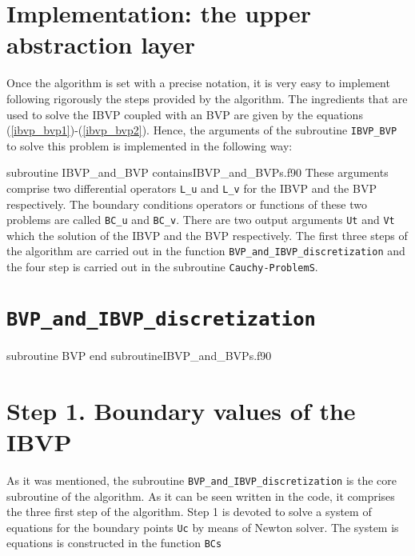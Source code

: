 
 
       

       

 
\newpage
\section{Implementation: the upper abstraction layer}

Once the algorithm is set with a precise notation, it is very easy to implement following rigorously the steps provided by the algorithm. 
The ingredients that are used to solve the IBVP coupled with an BVP are given by the equations (\ref{ibvp_bvp1})-(\ref{ibvp_bvp2}). Hence, the arguments of the subroutine \verb|IBVP_BVP| to solve this problem is implemented in the following way: 
 
\vspace{0.5cm} 
{subroutine IBVP_and_BVP}
{contains}{IBVP_and_BVPs.f90}
These arguments comprise two differential operators \verb|L_u| and \verb|L_v| for the IBVP and the BVP respectively. The boundary conditions operators or functions of these two problems are called  \verb|BC_u| and \verb|BC_v|. There are two output arguments \verb|Ut| and \verb|Vt| which the solution of the IBVP and the BVP respectively. 
The first three steps of the algorithm are carried out in the function \verb|BVP_and_IBVP_discretization| and the four step is carried out in the subroutine \verb|Cauchy-ProblemS|.

\section{\texttt{BVP\_and\_IBVP\_discretization}}

\vspace{0.5cm} 
{subroutine BVP}
{end subroutine}{IBVP_and_BVPs.f90}


\section{Step 1. Boundary values of the IBVP}
As it was mentioned, the subroutine \verb|BVP_and_IBVP_discretization| is the core subroutine of the algorithm. As it can be seen written in the code, it comprises the three first step of the algorithm. 
Step 1 is devoted to solve a system of equations for the boundary points \verb|Uc| by means of Newton solver. The system is equations is constructed in the function \verb|BCs| 

